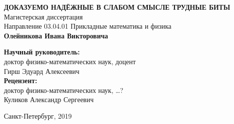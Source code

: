 \begin{titlepage}

\begin{center}
\end{center}

\vspace{2cm}
\begin{center}
  \MakeUppercase{\textbf{Доказуемо надёжные в слабом смысле трудные биты}}
  \\
  Магистерская диссертация
  \\[1cm]
  Направление 03.04.01 Прикладные математика и физика
  \\[1cm]
  {\fontsize{18}{21.6}\selectfont
    \textbf{Олейникова Ивана Викторовича}
  }
  \\[2cm]
\end{center}

\hfill
\begin{minipage}{0.6\textwidth}
\textbf{Научный руководитель:} \\
доктор физико-математических наук, доцент \\
Гирш Эдуард Алексеевич \\[0.5cm]
\textbf{Рецензент:} \\
доктор физико-математических наук, \dots ? \\
Куликов Александр Сергеевич
\end{minipage}

\begin{center}
\mbox{}
\vfill
Санкт-Петербург, 2019
\end{center}

\end{titlepage}
\newpage
